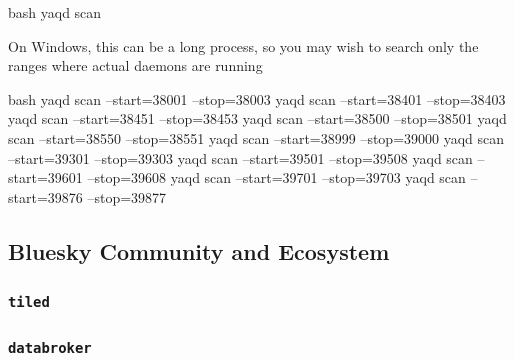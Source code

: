 \begin{codefragment}{bash}
yaqd scan
\end{codefragment}

On Windows, this can be a long process, so you may wish to search only the ranges where actual daemons are running

\begin{codefragment}{bash}
yaqd scan --start=38001 --stop=38003
yaqd scan --start=38401 --stop=38403
yaqd scan --start=38451 --stop=38453
yaqd scan --start=38500 --stop=38501
yaqd scan --start=38550 --stop=38551
yaqd scan --start=38999 --stop=39000
yaqd scan --start=39301 --stop=39303
yaqd scan --start=39501 --stop=39508
yaqd scan --start=39601 --stop=39608
yaqd scan --start=39701 --stop=39703
yaqd scan --start=39876 --stop=39877
\end{codefragment}

\subsection{Bluesky Community and Ecosystem}
\subsubsection{\texttt{tiled}}
\subsubsection{\texttt{databroker}}

\clearpage
